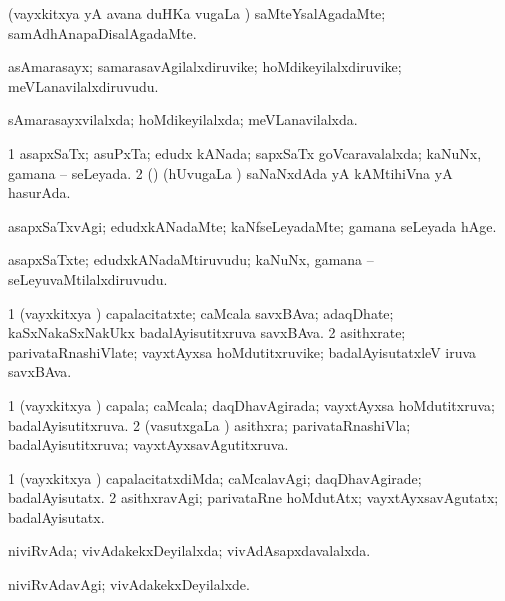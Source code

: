 \bentry
{}
\gl{\kirxvi}
\bmng
(vayxkitxya yA avana duHKa \mo vugaLa \vi) saMteYsalAgadaMte; samAdhAnapaDisalAgadaMte. 
\emng
\eentry

\bentry
{}
\gl{\nA}
\bmng
asAmarasayx; samarasavAgilalxdiruvike; hoMdikeyilalxdiruvike; meVLanavilalxdiruvudu. 
\emng
\eentry

\bentry
{}
\gl{\gu}
\bmng
sAmarasayxvilalxda; hoMdikeyilalxda; meVLanavilalxda. 
\emng
\eentry

\bentry
{}
\gl{\gu}
\bmng
\bnum
\num{1} asapxSaTx; asuPxTa; edudx kANada; sapxSaTx goVcaravalalxda; kaNuNx, gamana -- seLeyada. 
\num{2} (\savi) (hUvugaLa \vi) saNaNxdAda yA kAMtihiVna yA hasurAda. 
\enum
\emng
\eentry

\bentry
{}
\gl{\kirxvi}
\bmng
asapxSaTxvAgi; edudxkANadaMte; kaNfseLeyadaMte; gamana seLeyada hAge. 
\emng
\eentry

\bentry
{}
\gl{\nA}
\bmng
asapxSaTxte; edudxkANadaMtiruvudu; kaNuNx, gamana -- seLeyuvaMtilalxdiruvudu. 
\emng
\eentry

\bentry
{}
\gl{\nA}
\bmng
\bnum
\num{1} (vayxkitxya \vi) capalacitatxte; caMcala savxBAva; adaqDhate; kaSxNakaSxNakUkx badalAyisutitxruva savxBAva. 
\num{2} asithxrate; parivataRnashiVlate; vayxtAyxsa hoMdutitxruvike; badalAyisutatxleV iruva savxBAva. 
\enum
\emng
\eentry

\bentry
{}
\gl{\gu}
\bmng
\bnum
\num{1} (vayxkitxya \vi) capala; caMcala; daqDhavAgirada; vayxtAyxsa hoMdutitxruva; badalAyisutitxruva. 
\num{2} (vasutxgaLa \vi) asithxra; parivataRnashiVla; badalAyisutitxruva; vayxtAyxsavAgutitxruva. 
\enum
\emng
\eentry

\bentry
{}
\gl{\kirxvi}
\bmng
\bnum
\num{1} (vayxkitxya \vi) capalacitatxdiMda; caMcalavAgi; daqDhavAgirade; badalAyisutatx. 
\num{2} asithxravAgi; parivataRne hoMdutAtx; vayxtAyxsavAgutatx; badalAyisutatx. 
\enum
\emng
\eentry

\bentry
{}
\gl{\gu}
\bmng
niviRvAda; vivAdakekxDeyilalxda; vivAdAsapxdavalalxda. 
\emng
\eentry

\bentry
{}
\gl{\kirxvi}
\bmng
niviRvAdavAgi; vivAdakekxDeyilalxde. 
\emng
\eentry

